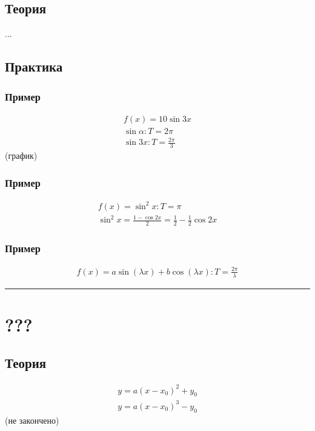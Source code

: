 \documentclass{article}
\begin{document}
\subsection{Теория}
...


\subsection{Практика}

\subsubsection{Пример}
\begin{gather*}
    f(x) = 10 \sin 3x \\
    \sin \alpha: T = 2\pi \\
    \sin 3x: T = \frac{2\pi}{3}
\end{gather*}
(график)

\subsubsection{Пример}
\begin{gather*}
    f(x) = \sin^2 x: T = \pi \\
    \sin^2 x = \frac{1 - \cos 2x}{2} = \frac{1}{2} - \frac{1}{2} \cos 2x     
\end{gather*}

\subsubsection{Пример}
\begin{gather*}
    f(x) = a \sin(\lambda x) + b \cos(\lambda x): T = \frac{2 \pi}{\lambda}
\end{gather*}



\par\noindent\rule{\textwidth}{1pt}
\section{???}

\subsection{Теория}
\begin{gather*}
    y = a(x - x_0)^2 + y_0 \\
    y = a(x - x_0)^3 - y_0
\end{gather*}
(не закончено)
\end{document}
